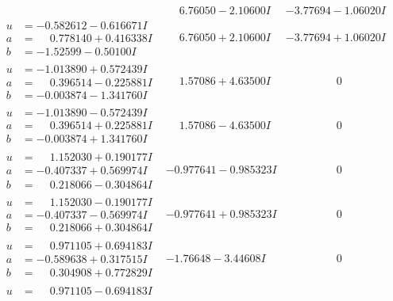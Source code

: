 \documentclass[1p]{elsarticle_modified}
\theoremstyle{definition}
\begin{document}
$$\begin{array}{c|c|c}
 & \phantom{-}6.76050 - 2.10600 I & -3.77694 - 1.06020 I \\ \hline\begin{aligned}
u &= -0.582612 - 0.616671 I \\
a &= \phantom{-}0.778140 + 0.416338 I \\
b &= -1.52599 - 0.50100 I\end{aligned}
 & \phantom{-}6.76050 + 2.10600 I & -3.77694 + 1.06020 I \\ \hline\begin{aligned}
u &= -1.013890 + 0.572439 I \\
a &= \phantom{-}0.396514 - 0.225881 I \\
b &= -0.003874 - 1.341760 I\end{aligned}
 & \phantom{-}1.57086 + 4.63500 I & \phantom{-0.000000 } 0 \\ \hline\begin{aligned}
u &= -1.013890 - 0.572439 I \\
a &= \phantom{-}0.396514 + 0.225881 I \\
b &= -0.003874 + 1.341760 I\end{aligned}
 & \phantom{-}1.57086 - 4.63500 I & \phantom{-0.000000 } 0 \\ \hline\begin{aligned}
u &= \phantom{-}1.152030 + 0.190177 I \\
a &= -0.407337 + 0.569974 I \\
b &= \phantom{-}0.218066 - 0.304864 I\end{aligned}
 & -0.977641 - 0.985323 I & \phantom{-0.000000 } 0 \\ \hline\begin{aligned}
u &= \phantom{-}1.152030 - 0.190177 I \\
a &= -0.407337 - 0.569974 I \\
b &= \phantom{-}0.218066 + 0.304864 I\end{aligned}
 & -0.977641 + 0.985323 I & \phantom{-0.000000 } 0 \\ \hline\begin{aligned}
u &= \phantom{-}0.971105 + 0.694183 I \\
a &= -0.589638 + 0.317515 I \\
b &= \phantom{-}0.304908 + 0.772829 I\end{aligned}
 & -1.76648 - 3.44608 I & \phantom{-0.000000 } 0 \\ \hline\begin{aligned}
u &= \phantom{-}0.971105 - 0.694183 I \\

\end{aligned}
\end{array}$$
\end{document}
